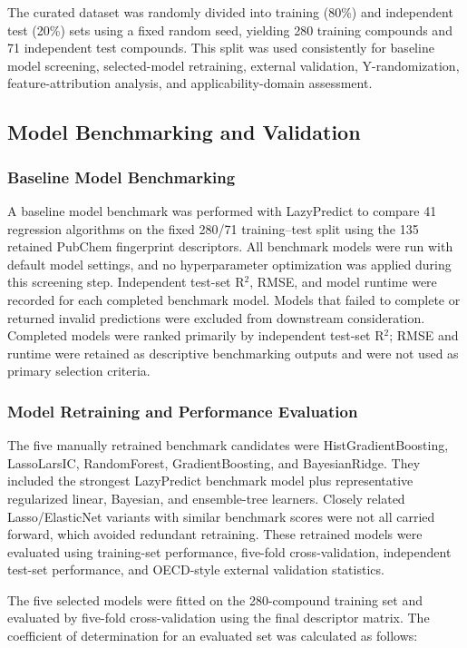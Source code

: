 \documentclass[11pt]{article}
\begin{document}
The curated dataset was randomly divided into training (80\%) and independent test (20\%) sets using a fixed random seed, yielding 280 training compounds and 71 independent test compounds. This split was used consistently for baseline model screening, selected-model retraining, external validation, Y-randomization, feature-attribution analysis, and applicability-domain assessment.

\subsection{Model Benchmarking and Validation}

\subsubsection{Baseline Model Benchmarking}

A baseline model benchmark was performed with LazyPredict to compare 41 regression algorithms on the fixed 280/71 training--test split using the 135 retained PubChem fingerprint descriptors. All benchmark models were run with default model settings, and no hyperparameter optimization was applied during this screening step. Independent test-set R$^2$, RMSE, and model runtime were recorded for each completed benchmark model. Models that failed to complete or returned invalid predictions were excluded from downstream consideration. Completed models were ranked primarily by independent test-set R$^2$; RMSE and runtime were retained as descriptive benchmarking outputs and were not used as primary selection criteria.

\subsubsection{Model Retraining and Performance Evaluation}

The five manually retrained benchmark candidates were HistGradientBoosting, LassoLarsIC, RandomForest, GradientBoosting, and BayesianRidge. They included the strongest LazyPredict benchmark model plus representative regularized linear, Bayesian, and ensemble-tree learners. Closely related Lasso/ElasticNet variants with similar benchmark scores were not all carried forward, which avoided redundant retraining. These retrained models were evaluated using training-set performance, five-fold cross-validation, independent test-set performance, and OECD-style external validation statistics.

The five selected models were fitted on the 280-compound training set and evaluated by five-fold cross-validation using the final descriptor matrix. The coefficient of determination for an evaluated set was calculated as follows:
\end{document}
